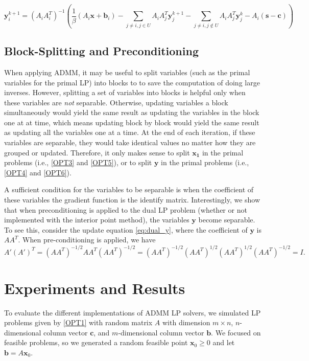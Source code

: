 \documentclass{article}
\begin{document}
\[
\mathbf{y}_{i}^{k+1}=\left(A_{i}A_{i}^{T}\right)^{-1}\left(\frac{1}{\beta}\left(A_{i}\mathbf{x}+\mathbf{b}_{i}\right)-\sum_{j\neq i,j\in U}A_{i}A_{j}^{T}\mathbf{y}_{j}^{k+1}-\sum_{j\neq i,j\notin U}A_{i}A_{j}^{T}\mathbf{y}_{j}^{k}-A_{i}\left(\mathbf{s}-\mathbf{c}\right)\right)
\]

\subsection*{Block-Splitting and Preconditioning}
When applying ADMM, it may be useful to split variables (such as the primal variables for the primal LP) into blocks to to save the computation of doing large inverses. However, splitting a set of variables into blocks is helpful only when these variables are {\it not} separable. Otherwise, updating variables a block simultaneously would yield the same result as updating the variables in the block one at at time, which means updating block by block would yield the same result as updating all the variables one at a time. At the end of each iteration, if these variables are separable, they would take identical values no matter how they are grouped or updated. Therefore, it only makes sense to split $\mathbf{x_1}$ in the primal problems (i.e.,  \eqref{OPT3} and \eqref{OPT5}), or to split $\mathbf{y}$ in the primal problems (i.e.,  \eqref{OPT4} and \eqref{OPT6}).

A sufficient condition for the variables to be separable is when the coefficient of these variables the gradient function is the identify matrix. Interestingly, we show that when preconditioning is applied to the dual LP problem (whether or not implemented with the interior point method), the variables $\mathbf{y}$ become separable. To see this, consider the update equation \eqref{eq:dual_y}, where the coefficient of $\mathbf{y}$ is $A A^T$. When pre-conditioning is applied, we have
\[
A' (A')^T  = (AA^T )^{-1/2}A A^T (AA^T )^{-1/2} =  (AA^T )^{-1/2}(AA^T )^{1/2} (AA^T )^{1/2} (AA^T )^{-1/2}  = I.
\]


\vspace{0.5in}
\section{Experiments and Results}

To evaluate the different implementations of ADMM LP solvers, we simulated LP problems given by \eqref{OPT1} with random matrix $A$ with dimension $m\times n$, $n$-dimensional column vector $\mathbf{c}$, and $m$-dimensional column vector $\mathbf{b}$. We focused on feasible problems, so we generated a random feasible point $\mathbf{x}_0 \geq 0$ and let $ \mathbf{b} = A \mathbf{x}_0 $. 
\end{document}
